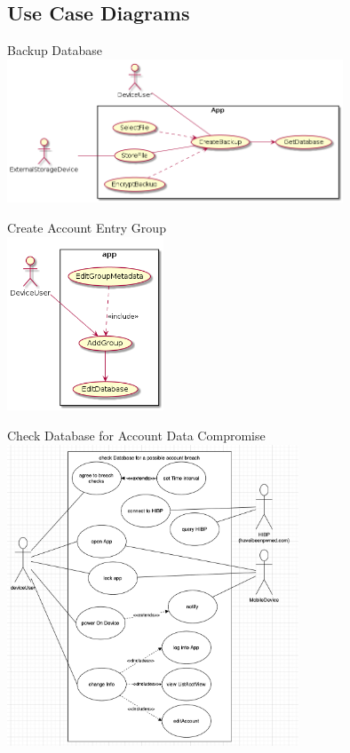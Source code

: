 \documentclass[stu]{apa7}
\begin{document}
\normalsize

\subsection{Use Case Diagrams}

Backup Database \\
\includegraphics[width=0.75\textwidth]{diag/gt/uc1.png}

Create Account Entry Group \\
\includegraphics[width=0.35\textwidth]{diag/gt/uc2.png}

\pagebreak
Check Database for Account Data Compromise \\
\includegraphics[width=0.65\textwidth]{diag/rjm/uc1.png}
\end{document}
